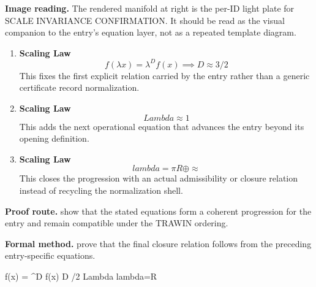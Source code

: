 \begin{samepage}
\noindent\begin{minipage}[t]{0.45\linewidth}
\vspace{0pt}
\raggedright
\scriptsize\textbf{Image reading.} The rendered manifold at right is the per-ID light plate for SCALE INVARIANCE CONFIRMATION. It should be read as the visual companion to the entry's equation layer, not as a repeated template diagram.\par
\end{minipage}\hfill
\begin{minipage}[t]{0.53\linewidth}
\vspace*{-0.10in}
\raggedright
{}
\end{minipage}
\end{samepage}

\clearpage


\begin{enumerate}[leftmargin=1.6em,itemsep=9pt,topsep=6pt]
\item \textbf{Scaling Law}
\[
f(\lambda x) = \lambda^D f(x) \implies D \approx 3/2
\]
This fixes the first explicit relation carried by the entry rather than a generic certificate record normalization.

\item \textbf{Scaling Law}
\[
Lambda \approx 1
\]
This adds the next operational equation that advances the entry beyond its opening definition.

\item \textbf{Scaling Law}
\[
lambda=\pi R\oplus\approx
\]
This closes the progression with an actual admissibility or closure relation instead of recycling the normalization shell.
\end{enumerate}

\textbf{Proof route.} show that the stated equations form a coherent progression for the entry and remain compatible under the TRAWIN ordering.

\textbf{Formal method.} prove that the final closure relation follows from the preceding entry-specific equations.

\medskip
{}

\begin{tzpsnapshot}
\end{tzpsnapshot}

\tzpequationlinks
  {f(\lambda x) = \lambda^D f(x) \implies D /2}
  {Lambda }
  {lambda=\pi R\oplus\approx}
